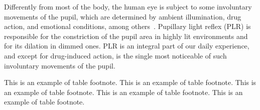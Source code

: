 \documentclass{acmtog}
\begin{document}
Differently from most of the body, the human eye is subject to some involuntary movements of the pupil, which are determined by ambient illumination, drug action, and emotional conditions, among others~\cite{BDDG-03}.
Pupillary light reflex (PLR) is responsible for the constriction of the pupil area in highly lit environments and for its dilation in dimmed ones. PLR is an integral part of our daily
experience, and except for drug-induced action, is the single most noticeable of such involuntary movements of the pupil. 


\begin{table}[t]
\label{tab:symbols}
\begin{tabnote}
This is an example of table footnote. This is an example of table footnote. This is an example of table footnote.
This is an example of table footnote. This is an example of table footnote.
\end{tabnote}
\end{table}
\end{document}
